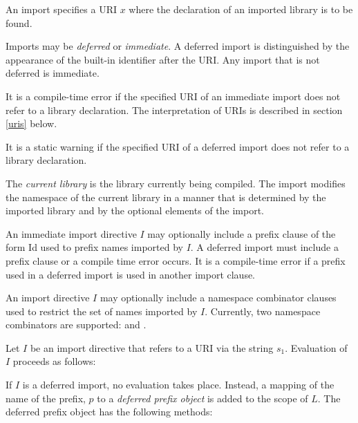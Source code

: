 \documentclass{article}
\newcommand{\code}[1]{{\sf #1}}
\begin{document}
\LMHash{}
An import specifies a URI $x$ where the declaration of an imported library is to be found. 

\LMHash{}
Imports may be {\em deferred} or {\em immediate}. A deferred import is distinguished by the appearance of the built-in identifier \DEFERRED{} after the URI. Any import that is not deferred is immediate.

\LMHash{}
It is a compile-time error if  the specified URI of an immediate import does not refer to a library declaration.  The interpretation of URIs is described in section \ref{uris} below.

\LMHash{}
It is a static warning if the specified URI of a deferred import does not refer to a library declaration.


 
\LMHash{}
The {\em current library} is the library currently being compiled. The import modifies the  namespace of the current library in a manner that is determined by the imported library and by the optional elements of  the import.
     
\LMHash{}
An immediate import directive $I$ may optionally include a prefix clause of the form \AS{} \code{Id} used to prefix names imported by $I$. A deferred import must include a prefix clause or a compile time error occurs. It is a compile-time error if a prefix used in a deferred import is used in another import clause.

\LMHash{}
An import directive $I$ may optionally include a namespace combinator clauses used to restrict the set of names imported by $I$. Currently, two namespace combinators are supported: \HIDE{} and \SHOW{}.

\LMHash{}
Let $I$ be an import directive that refers to a URI via the string $s_1$. Evaluation of $I$  proceeds as follows:

\LMHash{}
If $I$ is a deferred import, no evaluation takes place. Instead, a mapping of the name of the prefix, $p$ to a {\em deferred prefix object} is added to the scope of $L$.
The deferred prefix object has the following methods:
\end{document}
